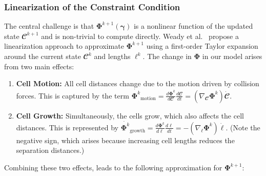 \documentclass[conference]{IEEEtran}
\begin{document}
\subsubsection{Linearization of the Constraint Condition}



The central challenge is that $\mathbf{\Phi}^{k+1}(\boldsymbol{\gamma})$ is a nonlinear function of the updated state $\mathbfcal{C}^{k+1}$ and is non-trivial to compute directly. Weady et al.~\cite{Weady2024SM} propose a linearization approach to approximate $\mathbf{\Phi}^{k+1}$ using a first-order Taylor expansion around the current state $\mathbfcal{C}^k$ and lengths $\boldsymbol{\ell}^k$. The change in $\mathbf{\Phi}$ in our model arises from two main effects:

\begin{enumerate}
    \item \textbf{Cell Motion:} All cell distances change due to the motion driven by collision forces. This is captured by the term $\dot{\mathbf{\Phi}^k}_{\text{motion}} = \frac{d \mathbf{\Phi}^k}{d \mathbfcal{C}} \frac{d \mathbfcal{C}}{dt} = (\nabla_{\mathbfcal{C}} \mathbf{\Phi}^k) \dot{\mathbfcal{C}}$.
    \item \textbf{Cell Growth:} Simultaneously, the cells grow, which also affects the cell distances. This is represented by $\dot{\mathbf{\Phi}^k}_{\text{growth}} = \frac{d \mathbf{\Phi}^k}{d \boldsymbol{\ell}} \frac{d \boldsymbol{\ell}}{dt} =-(\nabla_{\boldsymbol{\ell}} \mathbf{\Phi}^k) \dot{\boldsymbol{\ell}}$. (Note the negative sign, which arises because increasing cell lengths reduces the separation distances.)
\end{enumerate}

Combining these two effects, leads to the following approximation for $\mathbf{\Phi}^{k+1}$:
\end{document}
